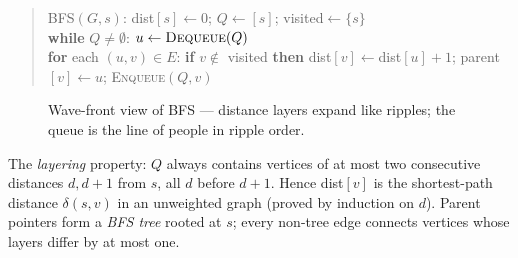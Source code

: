 \begin{quote}\ttfamily\scriptsize
\textsc{BFS}$(G,s)$: dist$[s]\gets0$; $Q\gets[s]$; visited$\gets\{s\}$\\
\textbf{while} $Q\neq\emptyset$: $u\gets\textsc{Dequeue}(Q)$\\
\textbf{for} each $(u,v)\in E$: \textbf{if} $v\notin$ visited \textbf{then} dist$[v]\gets$dist$[u]+1$; parent$[v]\gets u$; \textsc{Enqueue}$(Q,v)$
\end{quote}

\begin{figure}[h]\centering{}\caption{Wave-front view of BFS --- distance layers expand like ripples; the queue is the line of people in ripple order.}\label{fig:bfs-wave}\end{figure}
The \emph{layering} property: $Q$ always contains vertices of at most two consecutive distances $d,d+1$ from $s$, all $d$ before $d+1$. Hence dist$[v]$ is the shortest-path distance $\delta(s,v)$ in an unweighted graph (proved by induction on $d$). Parent pointers form a \emph{BFS tree} rooted at $s$; every non-tree edge connects vertices whose layers differ by at most one.

